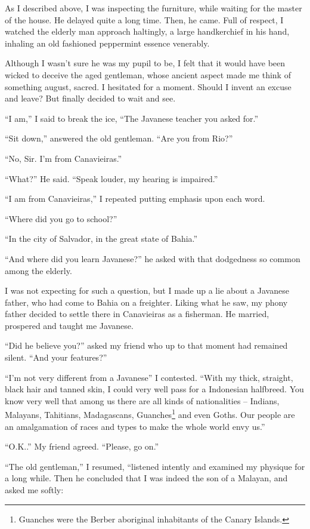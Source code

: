 \documentclass[a4paper,12pt]{book}
\begin{document}
As I described above, I was inspecting the furniture,
while waiting for the master of the house.
He delayed quite a long time. Then, he came.
Full of respect, I watched the elderly man
approach haltingly,
a large handkerchief in his
hand, inhaling an old fashioned peppermint
essence venerably.

Although I wasn't sure he was my pupil to be, I felt
that it would have been wicked to deceive the
aged gentleman, whose ancient aspect made
me think of something august, sacred.
I hesitated for a moment. Should I invent
an excuse and leave? But finally
decided to wait and see.

``I am,'' I said to break the ice,
``The Javanese teacher you asked for.''

``Sit down,'' answered the old gentleman.
``Are you from Rio?''

``No, Sir. I'm from Canavieiras.''

``What?'' He said. ``Speak louder, my hearing is impaired.''

``I am from Canavieiras,'' I repeated putting emphasis
upon each word.

``Where did you go to school?''

``In the city of Salvador, in the great state of Bahia.''

``And where did you learn Javanese?'' he
asked with that dodgedness so common among the elderly.

I was not expecting for such a question,
but I made up a lie about a
Javanese father, who had come to Bahia
on a freighter. Liking what he saw,
my phony father decided to
settle there in Canavieiras as a fisherman.
He married, prospered and taught me Javanese.

``Did he believe you?'' asked my friend
who up to that moment had remained silent.
``And your features?''

``I'm not very different from a Javanese''
I contested. ``With my thick, straight, black hair
and tanned skin, I could very well pass for
a Indonesian halfbreed. You know very well
that among us there are all kinds of nationalities
-- Indians, Malayans, Tahitians, Madagascans,
Guanches\footnote{Guanches were the Berber aboriginal
inhabitants of the Canary Islands.}
and even Goths. Our people are an amalgamation
of races and types to make the whole world envy us.''

``O.K..'' My friend agreed. ``Please, go on.''

``The old gentleman,''  I resumed,
``listened intently and examined my physique
for a long while. Then he concluded that I was
indeed the son of a Malayan, and asked me softly:
\end{document}
